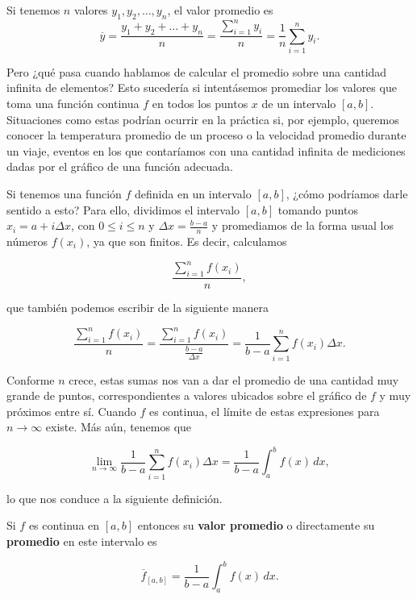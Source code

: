 \documentclass[
  letterpaper,
]{book}
\theoremstyle{plain}
\theoremstyle{remark}
\begin{document}
Si tenemos \(n\) valores \(y_1, y_2, \dots, y_n\), el valor promedio es
\[
\overline{y}=\frac{y_1 + y_2 + \dots + y_n}{n}=\frac{\sum_{i=1}^n y_i}{n}=\frac{1}{n}\sum_{i=1}^n y_i.
\]

Pero ¿qué pasa cuando hablamos de calcular el promedio sobre una
cantidad infinita de elementos? Esto sucedería si intentásemos promediar
los valores que toma una función continua \(f\) en todos los puntos
\(x\) de un intervalo \([a,b]\). Situaciones como estas podrían ocurrir
en la práctica si, por ejemplo, queremos conocer la temperatura promedio
de un proceso o la velocidad promedio durante un viaje, eventos en los
que contaríamos con una cantidad infinita de mediciones dadas por el
gráfico de una función adecuada.

Si tenemos una función \(f\) definida en un intervalo \([a,b]\), ¿cómo
podríamos darle sentido a esto? Para ello, dividimos el intervalo
\([a,b]\) tomando puntos \(x_i = a + i \Delta x\), con \(0\leq i\leq n\)
y \(\Delta x = \frac{b-a}{n}\) y promediamos de la forma usual los
números \(f(x_i)\), ya que son finitos. Es decir, calculamos

\[
\frac{\sum_{i=1}^n f(x_i)}{n},
\]

que también podemos escribir de la siguiente manera

\[
\frac{\sum_{i=1}^n f(x_i)}{n} = \frac{\sum_{i=1}^n f(x_i)}{\frac{b-a}{\Delta x}} = \frac{1}{b-a}\sum_{i=1}^n f(x_i) \Delta x.
\]

Conforme \(n\) crece, estas sumas nos van a dar el promedio de una
cantidad muy grande de puntos, correspondientes a valores ubicados sobre
el gráfico de \(f\) y muy próximos entre sí. Cuando \(f\) es continua,
el límite de estas expresiones para \(n\to \infty\) existe. Más aún,
tenemos que

\[
\lim_{n\to \infty} \frac{1}{b-a}\sum_{i=1}^n f(x_i)\Delta x=\frac{1}{b-a}\int_a^b f(x)\,dx,
\]

lo que nos conduce a la siguiente definición.

\begin{tcolorbox}[enhanced jigsaw, opacityback=0, left=2mm, opacitybacktitle=0.6, toprule=.15mm, bottomrule=.15mm, colbacktitle=quarto-callout-note-color!10!white, titlerule=0mm, bottomtitle=1mm, title=\textcolor{quarto-callout-note-color}{\faInfo}\hspace{0.5em}{Definición (Valor promedio de una función en un intervalo)}, toptitle=1mm, colframe=quarto-callout-note-color-frame, colback=white, breakable, rightrule=.15mm, arc=.35mm, leftrule=.75mm, coltitle=black]

Si \(f\) es continua en \([a,b]\) entonces su \textbf{valor promedio} o
directamente su \textbf{promedio} en este intervalo es

\[
\overline{f}_{[a,b]}=\frac{1}{b-a}\int_a^b f(x)\,dx.
\]

\end{tcolorbox}
\end{document}
